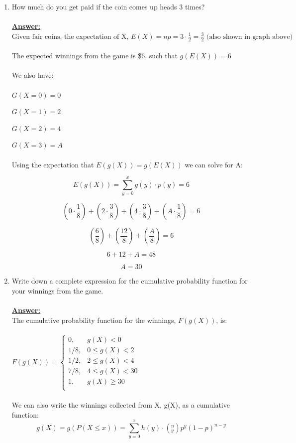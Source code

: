 \documentclass[12pt,a4paper]{article}
\numberwithin{equation}{subsection}
\begin{document}
\begin{enumerate}
\begin{enumerate}
\item How much do you get paid if the coin comes up heads 3 times?
\\
\\
\textbf{\underline{Answer:}}
\\
$\text{Given fair coins, the expectation of X, } E(X) = np = 3 \cdot \frac{1}{2} = \frac{3}{2} \text{ (also shown in graph above)}$
\\
\\
The expected winnings from the game is \$6, such that $g(E(X)) = 6$
\\
\\
We also have:
\\
\\
$G(X=0) = 0$

$G(X=1) = 2$

$G(X=2) = 4$

$G(X=3) = A$
\\
\\
Using the expectation that $E(g(X)) = g(E(X))$ we can solve for A:

$$E(g(X)) = \sum_{y=0}^x g(y) \cdot p(y) = 6$$

$$(0 \cdot \frac{1}{8}) + (2 \cdot \frac{3}{8}) + (4 \cdot \frac{3}{8}) +  (A \cdot \frac{1}{8} ) = 6$$

$$(\frac{6}{8}) + (\frac{12}{8}) + (\frac{A}{8}) = 6$$

$$6 + 12 + A = 48$$

$$A = 30$$


\item Write down a complete expression for the cumulative probability function for your winnings from the game.
\\
\\
\textbf{\underline{Answer:}}
\\
The cumulative probability function for the winnings, $F(g(X))$, is:
\\
\\
$F(g(X)) = \begin{cases}
0, &g(X) < 0 \\
1/8,  &0 \leq g(X) < 2 \\
1/2, &2 \leq g(X) < 4 \\
7/8, &4 \leq g(X) < 30 \\
1, &g(X) \geq 30\\
\end{cases}$
\\
\\
We can also write the winnings collected from X,  g(X), as a cumulative function:
$$g(X) = g(P(X \leq x)) = \sum_{y=0}^x h(y) \cdot \left(^n_y \right)p^y(1-p)^{n-y}$$


\end{enumerate}
\end{enumerate}
\end{document}
